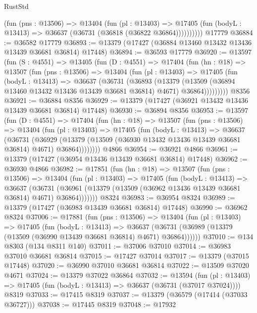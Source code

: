 \begin{lexlean}{RustStd}
\begin{coremodule}
            (fun (pns : @13506) =>
            @13404
              (fun (pl : @13403) =>
              @17405 (fun (bodyL : @13413) => @36637 (@36731 (@36818 (@36822 @36864))))))))))
    @17779
@36884 := @36582 @17779
@36893 := @13379 (@17427 (@36884 @13460 @13432 @13436 @13439 @36681 @36814) @17448)
@36894 := @36593 @17779
@36920 := @13597
    (fun (S : @4551) =>
    @13405
      (fun (D : @4551) =>
      @17404
        (fun (hn : @18) =>
        @13507
          (fun (pns : @13506) =>
          @13404
            (fun (pl : @13403) =>
            @17405
              (fun (bodyL : @13413) =>
              @36637
                (@36731
                  (@36893
                    (@13379
                      (@13509 (@36894 @13460 @13432 @13436 @13439 @36681 @36814) @4671)
                      @36864)))))))))
    @8356
@36921 := @36884 @8356
@36929 := @13379 (@17427 (@36921 @13432 @13436 @13439 @36681 @36814) @17448)
@36930 := @36894 @8356
@36953 := @13597
    (fun (D : @4551) =>
    @17404
      (fun (hn : @18) =>
      @13507
        (fun (pns : @13506) =>
        @13404
          (fun (pl : @13403) =>
          @17405
            (fun (bodyL : @13413) =>
            @36637
              (@36731
                (@36929
                  (@13379 (@13509 (@36930 @13432 @13436 @13439 @36681 @36814) @4671) @36864))))))))
    @4866
@36954 := @36921 @4866
@36961 := @13379 (@17427 (@36954 @13436 @13439 @36681 @36814) @17448)
@36962 := @36930 @4866
@36982 := @17851
    (fun (hn : @18) =>
    @13507
      (fun (pns : @13506) =>
      @13404
        (fun (pl : @13403) =>
        @17405
          (fun (bodyL : @13413) =>
          @36637
            (@36731
              (@36961 (@13379 (@13509 (@36962 @13436 @13439 @36681 @36814) @4671) @36864)))))))
    @8324
@36983 := @36954 @8324
@36989 := @13379 (@17427 (@36983 @13439 @36681 @36814) @17448)
@36990 := @36962 @8324
@37006 := @17881
    (fun (pns : @13506) =>
    @13404
      (fun (pl : @13403) =>
      @17405
        (fun (bodyL : @13413) =>
        @36637 (@36731 (@36989 (@13379 (@13509 (@36990 @13439 @36681 @36814) @4671) @36864))))))
@37010 := @134 @8303 (@134 @8311 @140)
@37011 := @37006 @37010
@37014 := @36983 @37010 @36681 @36814
@37015 := @17427 @37014
@37017 := @13379 (@37015 @17448)
@37020 := @36990 @37010 @36681 @36814
@37022 := @13509 @37020 @4671
@37024 := @13379 @37022 @36864
@37032 := @13594
    (fun (pl : @13403) => @17405 (fun (bodyL : @13413) => @36637 (@36731 (@37017 @37024))))
    @8319
@37033 := @17415 @8319
@37037 := @13379 (@36579 (@17414 (@37033 @36727)))
@37038 := @17445 @8319
@37048 := @17932

\end{coremodule}
\end{lexlean}
